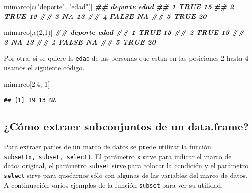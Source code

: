 \documentclass[
]{book}
\newenvironment{Shaded}{\begin{snugshade}}{\end{snugshade}}
\newcommand{\DecValTok}[1]{\textcolor[rgb]{0.00,0.00,0.81}{#1}}
\newcommand{\DocumentationTok}[1]{\textcolor[rgb]{0.56,0.35,0.01}{\textbf{\textit{#1}}}}
\newcommand{\FunctionTok}[1]{\textcolor[rgb]{0.00,0.00,0.00}{#1}}
\newcommand{\NormalTok}[1]{#1}
\newcommand{\SpecialCharTok}[1]{\textcolor[rgb]{0.00,0.00,0.00}{#1}}
\newcommand{\StringTok}[1]{\textcolor[rgb]{0.31,0.60,0.02}{#1}}
\begin{document}
\begin{Shaded}
\begin{Highlighting}[]
\NormalTok{mimarco[}\FunctionTok{c}\NormalTok{(}\StringTok{"deporte"}\NormalTok{, }\StringTok{"edad"}\NormalTok{)]}
\DocumentationTok{\#\#   deporte edad}
\DocumentationTok{\#\# 1    TRUE   15}
\DocumentationTok{\#\# 2    TRUE   19}
\DocumentationTok{\#\# 3      NA   13}
\DocumentationTok{\#\# 4   FALSE   NA}
\DocumentationTok{\#\# 5    TRUE   20}

\NormalTok{mimarco[,}\FunctionTok{c}\NormalTok{(}\DecValTok{2}\NormalTok{,}\DecValTok{1}\NormalTok{)]}
\DocumentationTok{\#\#   deporte edad}
\DocumentationTok{\#\# 1    TRUE   15}
\DocumentationTok{\#\# 2    TRUE   19}
\DocumentationTok{\#\# 3      NA   13}
\DocumentationTok{\#\# 4   FALSE   NA}
\DocumentationTok{\#\# 5    TRUE   20}
\end{Highlighting}
\end{Shaded}

Por otra, si se quiere la \texttt{edad} de las personas que están en las posiciones 2 hasta 4 usamos el siguiente código.

\begin{Shaded}
\begin{Highlighting}[]
\NormalTok{mimarco[}\DecValTok{2}\SpecialCharTok{:}\DecValTok{4}\NormalTok{, }\DecValTok{1}\NormalTok{]}
\end{Highlighting}
\end{Shaded}

\begin{verbatim}
## [1] 19 13 NA
\end{verbatim}

\hypertarget{cuxf3mo-extraer-subconjuntos-de-un-data.frame}{%
\subsection{\texorpdfstring{¿Cómo extraer subconjuntos de un data.frame? }{¿Cómo extraer subconjuntos de un data.frame? }}\label{cuxf3mo-extraer-subconjuntos-de-un-data.frame}}

Para extraer partes de un marco de datos se puede utilizar la función \texttt{subset(x,\ subset,\ select)}. El parámetro \texttt{x} sirve para indicar el marco de datos original, el parámetro \texttt{subset} sirve para colocar la condición y el parámetro \texttt{select} sirve para quedarnos sólo con algunas de las variables del marco de datos. A continuación varios ejemplos de la función \texttt{subset} para ver su utilidad.
\end{document}
